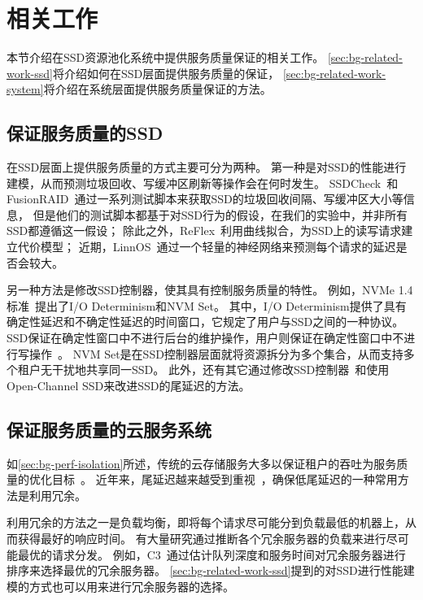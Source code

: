 \section{相关工作}
\label{sec:bg-related-work}

本节介绍在SSD资源池化系统中提供服务质量保证的相关工作。
\autoref{sec:bg-related-work-ssd}将介绍如何在SSD层面提供服务质量的保证，
\autoref{sec:bg-related-work-system}将介绍在系统层面提供服务质量保证的方法。

\subsection{保证服务质量的SSD}
\label{sec:bg-related-work-ssd}

在SSD层面上提供服务质量的方式主要可分为两种。
第一种是对SSD的性能进行建模，从而预测垃圾回收、写缓冲区刷新等操作会在何时发生。
SSDCheck~\cite{kim2018ssdcheck}和FusionRAID~\cite{jiang2021fusionraid}通过一系列测试脚本来获取SSD的垃圾回收间隔、写缓冲区大小等信息，
但是他们的测试脚本都基于对SSD行为的假设，在我们的实验中，并非所有SSD都遵循这一假设；
除此之外，ReFlex~\cite{klimovic2017reflex}利用曲线拟合，为SSD上的读写请求建立代价模型；
近期，LinnOS~\cite{hao2020linnos}通过一个轻量的神经网络来预测每个请求的延迟是否会较大。

另一种方法是修改SSD控制器，使其具有控制服务质量的特性。
例如，NVMe 1.4标准~\cite{nvme2020}提出了I/O Determinism和NVM Set。
其中，I/O Determinism提供了具有确定性延迟和不确定性延迟的时间窗口，它规定了用户与SSD之间的一种协议。
SSD保证在确定性窗口中不进行后台的维护操作，用户则保证在确定性窗口中不进行写操作~\cite{petersen2018enabling}。
NVM Set是在SSD控制器层面就将资源拆分为多个集合，从而支持多个租户无干扰地共享同一SSD。
此外，还有其它通过修改SSD控制器~\cite{yan2017tiny,arash2018flin}和使用Open-Channel SSD来改进SSD的尾延迟的方法。

\subsection{保证服务质量的云服务系统}
\label{sec:bg-related-work-system}

如\autoref{sec:bg-perf-isolation}所述，传统的云存储服务大多以保证租户的吞吐为服务质量的优化目标~\cite{patterson2004latency, cgroup,gulati2010mclock}。
近年来，尾延迟越来越受到重视~\cite{dean2013tail}，确保低尾延迟的一种常用方法是利用冗余。

利用冗余的方法之一是负载均衡，即将每个请求尽可能分到负载最低的机器上，从而获得最好的响应时间。
有大量研究通过推断各个冗余服务器的负载来进行尽可能最优的请求分发。
例如，C3~\cite{suresh2015c3}通过估计队列深度和服务时间对冗余服务器进行排序来选择最优的冗余服务器。
\autoref{sec:bg-related-work-ssd}提到的对SSD进行性能建模的方式也可以用来进行冗余服务器的选择。

